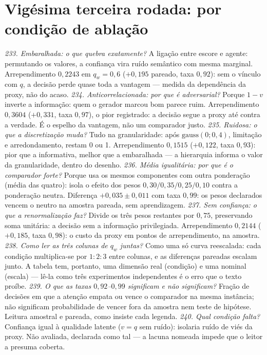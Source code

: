 \section{Vigésima terceira rodada: por condição de ablação}
\textit{233. Embaralhada: o que quebra exatamente?} A ligação entre escore e agente: permutando os valores, a confiança vira ruído semântico com mesma marginal. Arrependimento $0{,}2243$ em $q_w=0{,}6$ ($+0{,}195$ pareado, taxa $0{,}92$): sem o vínculo com $q$, a decisão perde quase toda a vantagem --- medida da dependência da proxy, não do acaso.
\textit{234. Anticorrelacionada: por que é adversarial?} Porque $1-v$ inverte a informação: quem o gerador marcou bom parece ruim. Arrependimento $0{,}3604$ ($+0{,}331$, taxa $0{,}97$), o pior registrado: a decisão segue a proxy até contra a verdade. É o espelho da vantagem, não um comparador justo.
\textit{235. Ruidosa: o que a discretização muda?} Tudo na granularidade: após $\mathrm{gauss}(0;0{,}4)$, limitação e arredondamento, restam 0 ou 1. Arrependimento $0{,}1515$ ($+0{,}122$, taxa $0{,}93$): pior que a informativa, melhor que a embaralhada --- a hierarquia informa o valor da granularidade, dentro do desenho.
\textit{236. Média igualitária: por que é o comparador forte?} Porque usa os mesmos componentes com outra ponderação (média das quatro): isola o efeito dos pesos $0{,}30/0{,}35/0{,}25/0{,}10$ contra a ponderação neutra. Diferença $+0{,}035\pm0{,}011$ com taxa $0{,}99$: os pesos declarados vencem o neutro na amostra pareada, sem aprendizagem.
\textit{237. Sem confiança: o que a renormalização faz?} Divide os três pesos restantes por $0{,}75$, preservando soma unitária: a decisão sem a informação privilegiada. Arrependimento $0{,}2144$ ($+0{,}185$, taxa $0{,}98$): o custo da proxy em pontos de arrependimento, na amostra.
\textit{238. Como ler as três colunas de $q_w$ juntas?} Como uma só curva reescalada: cada condição multiplica-se por $1{:}2{:}3$ entre colunas, e as diferenças pareadas escalam junto. A tabela tem, portanto, uma dimensão real (condição) e uma nominal (escala) --- lê-la como três experimentos independentes é o erro que o texto proíbe.
\textit{239. O que as taxas $0{,}92$--$0{,}99$ significam e não significam?} Fração de decisões em que a atenção empata ou vence o comparador na mesma instância; não significam probabilidade de vencer fora da amostra nem teste de hipótese. Leitura amostral e pareada, como insiste cada legenda.
\textit{240. Qual condição falta?} Confiança igual à qualidade latente ($v=q$ sem ruído): isolaria ruído de viés da proxy. Não avaliada, declarada como tal --- a lacuna nomeada impede que o leitor a presuma coberta.
